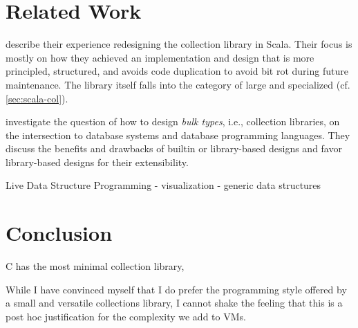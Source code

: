 \documentclass[sigconf, 10pt]{acmart}
\begin{document}
\section{Related Work}

\citet{Odersky:2009} describe their experience
redesigning the collection library in Scala.
Their focus is mostly on how they achieved an implementation and design
that is more principled, structured, and avoids code duplication
to avoid bit rot during future maintenance.
The library itself falls into the category of large and specialized (cf. \cref{sec:scala-col}). 

\citet{Matthes:2000:BT} investigate the question of how to design \emph{bulk types}, i.e., collection libraries, on the intersection to database systems and database programming languages.
They discuss the benefits and drawbacks of builtin or library-based designs and favor library-based designs for their extensibility.


Live Data Structure Programming \citep{Oka:2017:LDS}
- visualization
- generic data structures

\section{Conclusion}

C has the most minimal collection library, 


While I have convinced myself
that I do prefer the programming style offered
by a small and versatile collections library,
I cannot shake the feeling
that this is a post hoc justification
for the complexity we add to VMs.






\end{document}
